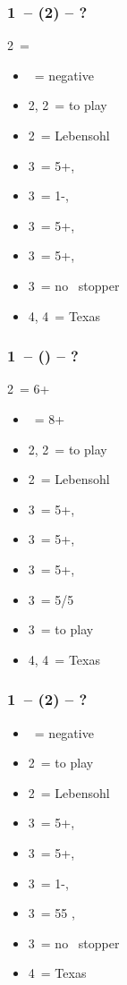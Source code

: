 \subsubsection*{1\ntx\ -- (2\diams) -- ?}
2\diams\ = \diams
\begin{itemize}
    \item \dbl\ = negative
    \item 2\hearts, 2\spades\ = to play
    \item 2\nt\ = Lebensohl
    \item 3\clubs\ = 5+\hearts, \invp
    \item 3\diams\ = 1-\diams, \invp
    \item 3\hearts\ = 5+\spades, \invp
    \item 3\spades\ = 5+\clubs, \invp
    \item 3\nt\ = no \diams\ stopper
    \item 4\diams, 4\hearts\ = Texas
\end{itemize}

\subsubsection*{1\ntx\ -- (\alrts{2\diams}) -- ?}
2\diams\ = 6+ \major
\begin{itemize}
    \item \dbl\ = 8+
    \item 2\hearts, 2\spades\ = to play
    \item 2\nt\ = Lebensohl
    \item 3\clubs\ = 5+\diams, \invp
    \item 3\diams\ = 5+\hearts, \invp
    \item 3\hearts\ = 5+\spades, \invp
    \item 3\spades\ = 5/5 \minor
    \item 3\nt\ = to play
    \item 4\diams, 4\hearts\ = Texas
\end{itemize}


\subsubsection*{1\ntx\ -- (2\hearts) -- ?}
\begin{itemize}
    \item \dbl\ = negative
    \item 2\spades\ = to play
    \item 2\nt\ = Lebensohl
    \item 3\clubs\ = 5+\diams, \invp
    \item 3\diams\ = 5+\spades, \invp
    \item 3\hearts\ = 1-\hearts, \invp
    \item 3\spades\ = 55 \minor, \gf
    \item 3\nt\ = no \hearts\ stopper
    \item 4\hearts\ = Texas
\end{itemize}

